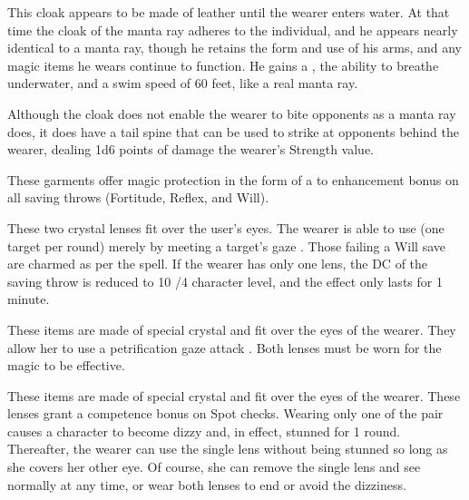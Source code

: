  This cloak appears to be made of leather until the wearer enters water. At that time the cloak of the manta ray adheres to the individual, and he appears nearly identical to a manta ray, though he retains the form and use of his arms, and any magic items he wears continue to function. He gains a  , the ability to breathe underwater, and a swim speed of 60 feet, like a real manta ray.

Although the cloak does not enable the wearer to bite opponents as a manta ray does, it does have a tail spine that can be used to strike at opponents behind the wearer, dealing 1d6 points of damage \add the wearer's Strength value.

  These garments offer magic protection in the form of a  to  enhancement bonus on all saving throws (Fortitude, Reflex, and Will).

 These two crystal lenses fit over the user's eyes. The wearer is able to use  (one target per round) merely by meeting a target's gaze . Those failing a Will save are charmed as per the spell. If the wearer has only one lens, the DC of the saving throw is reduced to 10 /4 character level, and the effect only lasts for 1 minute.

 These items are made of special crystal and fit over the eyes of the wearer. They allow her to use a petrification gaze attack . Both lenses must be worn for the magic to be effective.

 These items are made of special crystal and fit over the eyes of the wearer. These lenses grant a  competence bonus on Spot checks. Wearing only one of the pair causes a character to become dizzy and, in effect, stunned for 1 round. Thereafter, the wearer can use the single lens without being stunned so long as she covers her other eye. Of course, she can remove the single lens and see normally at any time, or wear both lenses to end or avoid the dizziness.

